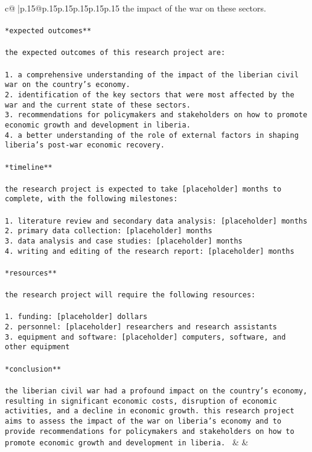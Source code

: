 \documentclass{article}
\begin{document}
{\begin{supertabular}{c@{$\;$}|p{.15\linewidth}@{}p{.15\linewidth}p{.15\linewidth}p{.15\linewidth}p{.15\linewidth}p{.15\linewidth}}
{{{the impact of the war on these sectors.\\ \tt \\ \tt **expected outcomes**\\ \tt \\ \tt the expected outcomes of this research project are:\\ \tt \\ \tt 1. a comprehensive understanding of the impact of the liberian civil war on the country's economy.\\ \tt 2. identification of the key sectors that were most affected by the war and the current state of these sectors.\\ \tt 3. recommendations for policymakers and stakeholders on how to promote economic growth and development in liberia.\\ \tt 4. a better understanding of the role of external factors in shaping liberia's post-war economic recovery.\\ \tt \\ \tt **timeline**\\ \tt \\ \tt the research project is expected to take [placeholder] months to complete, with the following milestones:\\ \tt \\ \tt 1. literature review and secondary data analysis: [placeholder] months\\ \tt 2. primary data collection: [placeholder] months\\ \tt 3. data analysis and case studies: [placeholder] months\\ \tt 4. writing and editing of the research report: [placeholder] months\\ \tt \\ \tt **resources**\\ \tt \\ \tt the research project will require the following resources:\\ \tt \\ \tt 1. funding: [placeholder] dollars\\ \tt 2. personnel: [placeholder] researchers and research assistants\\ \tt 3. equipment and software: [placeholder] computers, software, and other equipment\\ \tt \\ \tt **conclusion**\\ \tt \\ \tt the liberian civil war had a profound impact on the country's economy, resulting in significant economic costs, disruption of economic activities, and a decline in economic growth. this research project aims to assess the impact of the war on liberia's economy and to provide recommendations for policymakers and stakeholders on how to promote economic growth and development in liberia. 
	  } 
	   } 
	   } 
	 & & \\ 
 


\end{supertabular}}
\end{document}
